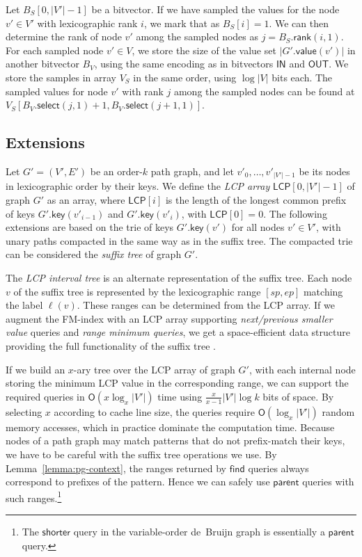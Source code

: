 \documentclass[a4paper,11pt]{llncs}
\newcommand{\abs}[1]{\ensuremath{\lvert #1 \rvert}}
\newcommand{\Oh}[1]{\ensuremath{\mathsf{O}\!\left( #1 \right)}}
\newcommand{\rank}{\ensuremath{\mathsf{rank}}}
\newcommand{\select}{\ensuremath{\mathsf{select}}}
\newcommand{\find}{\ensuremath{\mathsf{find}}}
\newcommand{\parent}{\ensuremath{\mathsf{parent}}}
\newcommand{\gkey}{\ensuremath{\mathsf{key}}}
\newcommand{\gvalue}{\ensuremath{\mathsf{value}}}
\newcommand{\orderk}[1]{order\nobreakdash-$#1$}
\newcommand{\LCP}{\ensuremath{\mathsf{LCP}}}
\newcommand{\bvIN}{\ensuremath{\mathsf{IN}}}
\newcommand{\bvOUT}{\ensuremath{\mathsf{OUT}}}
\begin{document}
Let $B_{S}[0, \abs{V'}-1]$ be a bitvector. If we have sampled the values for the node $v' \in V'$ with lexicographic rank $i$, we mark that as $B_{S}[i] = 1$. We can then determine the rank of node $v'$ among the sampled nodes as $j = B_{S}.\rank(i, 1)$. For each sampled node $v' \in V$, we store the size of the value set $\abs{G'.\gvalue(v')}$ in another bitvector $B_{V}$, using the same encoding as in bitvectors $\bvIN$ and $\bvOUT$. We store the samples in array $V_{S}$ in the same order, using $\log \abs{V}$ bits each. The sampled values for node $v'$ with rank $j$ among the sampled nodes can be found at $V_{S}[B_{V}.\select(j, 1) + 1, B_{V}.\select(j+1, 1)]$.

\subsection{Extensions}\label{sect:extensions}

Let $G' = (V', E')$ be an \orderk{k} path graph, and let $v'_{0}, \dotsc, v'_{\abs{V'}-1}$ be its nodes in lexicographic order by their keys. We define the \emph{LCP array} $\LCP[0, \abs{V'}-1]$ of graph $G'$ as an array, where $\LCP[i]$ is the length of the longest common prefix of keys $G'.\gkey(v'_{i-1})$ and $G'.\gkey(v'_{i})$, with $\LCP[0] = 0$. The following extensions are based on the trie of keys $G'.\gkey(v')$ for all nodes $v' \in V'$, with unary paths compacted in the same way as in the suffix tree. The compacted trie can be considered the \emph{suffix tree} of graph $G'$.

The \emph{LCP interval tree} \cite{Abouelhoda2004} is an alternate representation of the suffix tree. Each node $v$ of the suffix tree is represented by the lexicographic range $[sp, ep]$ matching the label $\ell(v)$. These ranges can be determined from the LCP array. If we augment the FM\nobreakdash-index with an LCP array supporting \emph{next/previous smaller value} queries and \emph{range minimum queries}, we get a space-efficient data structure providing the full functionality of the suffix tree \cite{Fischer2009a}.

If we build an $x$\nobreakdash-ary tree over the LCP array of graph $G'$, with each internal node storing the minimum LCP value in the corresponding range, we can support the required queries in $\Oh{x \log_{x} \abs{V'}}$ time using $\frac{x}{x-1} \abs{V'} \log k$ bits of space. By selecting $x$ according to cache line size, the queries require $\Oh{\log_{x} \abs{V'}}$ random memory accesses, which in practice dominate the computation time. Because nodes of a path graph may match patterns that do not prefix-match their keys, we have to be careful with the suffix tree operations we use. By Lemma~\ref{lemma:pg-context}, the ranges returned by $\find$ queries always correspond to prefixes of the pattern. Hence we can safely use $\parent$ queries with such ranges.\footnote{The $\textsf{shorter}$ query in the variable-order de~Bruijn graph \cite{Boucher2014} is essentially a $\parent$ query.}
\end{document}
